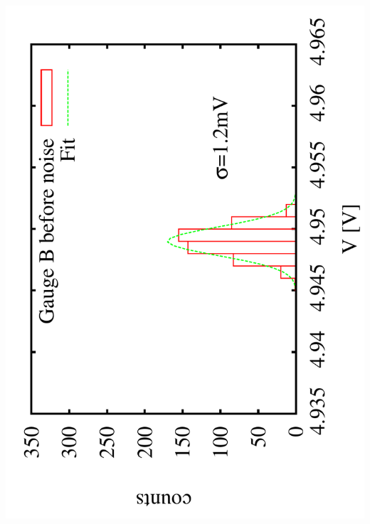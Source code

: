 \documentclass[a4paper,11pt]{book}
\begin{document}
  \includegraphics[scale=0.15,angle=-90]{image_ai_21e7.pdf}
\end{document}

